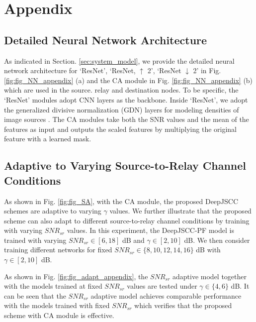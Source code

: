 \section*{Appendix}



\subsection{Detailed Neural Network Architecture}
As indicated in Section. \ref{sec:system_model}, we provide the detailed neural network architecture for `ResNet', `ResNet, $\uparrow$ 2', `ResNet $\downarrow$ 2' in Fig. \ref{fig:fig_NN_appendix} (a) and the CA module in Fig. \ref{fig:fig_NN_appendix} (b) which are used in the source. relay and destination nodes. To be specific, the `ResNet' modules adopt CNN layers as the backbone. Inside `ResNet', we adopt the generalized divisive normalization (GDN) layers for modeling densities of image sources \cite{gdn}. The CA modules take both the SNR values and the mean of the features as input and outputs the scaled features by multiplying the original feature with a learned mask.
\figneuralnetappendix


\subsection{Adaptive to Varying Source-to-Relay Channel Conditions} 
As shown in Fig. \ref{fig:fig_SA}, with the CA module, the proposed DeepJSCC schemes are adaptive to varying $\gamma$ values. We further illustrate that the proposed scheme can also adapt to different source-to-relay channel conditions by training with varying $SNR_{sr}$ values. In this experiment, the DeepJSCC-PF model is trained with varying $SNR_{sr} \in [6, 18]$ dB and $\gamma \in [2, 10]$ dB. We then consider training different networks for fixed $SNR_{sr} \in \{8, 10, 12, 14, 16\}$ dB with $\gamma \in [2, 10]$ dB. 

As shown in Fig. \ref{fig:fig_adapt_appendix}, the $SNR_{sr}$ adaptive model together with the models trained at fixed $SNR_{sr}$ values are tested under $\gamma \in \{4, 6\}$ dB. It can be seen that the $SNR_{sr}$ adaptive model achieves comparable performance with the models trained with fixed $SNR_{sr}$ which verifies that the proposed scheme with CA module is effective. 

\figadaptappendix
\figcliffeffect

